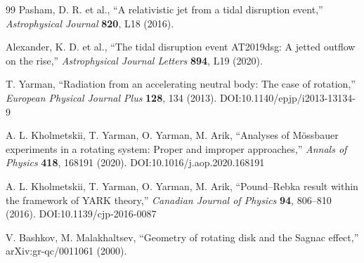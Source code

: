 \documentclass[12pt,a4paper]{article}
\begin{document}
\begin{thebibliography}{99}
		Pasham, D. R. et al., ``A relativistic jet from a tidal disruption event,'' \emph{Astrophysical Journal} \textbf{820}, L18 (2016).
		
		Alexander, K. D. et al., ``The tidal disruption event AT2019dsg: A jetted outflow on the rise,'' \emph{Astrophysical Journal Letters} \textbf{894}, L19 (2020).
		
		T. Yarman, ``Radiation from an accelerating neutral body: The case of rotation,'' \emph{European Physical Journal Plus} \textbf{128}, 134 (2013). DOI:10.1140/epjp/i2013-13134-9
		
		A. L. Kholmetskii, T. Yarman, O. Yarman, M. Arik, ``Analyses of Mössbauer experiments in a rotating system: Proper and improper approaches,'' \emph{Annals of Physics} \textbf{418}, 168191 (2020). DOI:10.1016/j.aop.2020.168191
		
		A. L. Kholmetskii, T. Yarman, O. Yarman, M. Arik, ``Pound–Rebka result within the framework of YARK theory,'' \emph{Canadian Journal of Physics} \textbf{94}, 806–810 (2016). DOI:10.1139/cjp-2016-0087
		
		V. Bashkov, M. Malakhaltsev, ``Geometry of rotating disk and the Sagnac effect,'' arXiv:gr-qc/0011061 (2000).
		
	\end{thebibliography}
	
\end{document}
